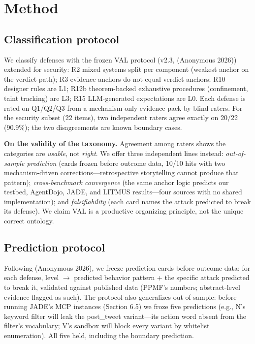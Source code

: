 \documentclass[11pt]{article}
\begin{document}
\section{Method}\label{method}

\subsection{Classification protocol}\label{classification-protocol}

We classify defenses with the frozen VAL protocol (v2.3, (Anonymous 2026)) extended for security: R2 mixed systems split per component (weakest anchor on the verdict path); R3 evidence anchors do not equal verdict anchors; R10 designer rules are L1; R12b theorem-backed exhaustive procedures (confinement, taint tracking) are L3; R15 LLM-generated expectations are L0. Each defense is rated on Q1/Q2/Q3 from a mechanism-only evidence pack by blind raters. For the security subset (22 items), two independent raters agree exactly on 20/22 (90.9\%); the two disagreements are known boundary cases.

\textbf{On the validity of the taxonomy.} Agreement among raters shows the categories are \emph{usable}, not \emph{right}. We offer three independent lines instead: \emph{out-of-sample prediction} (cards frozen before outcome data, 10/10 hits with two mechanism-driven corrections---retrospective storytelling cannot produce that pattern); \emph{cross-benchmark convergence} (the same anchor logic predicts our testbed, AgentDojo, JADE, and LITMUS results---four sources with no shared implementation); and \emph{falsifiability} (each card names the attack predicted to break its defense). We claim VAL is a productive organizing principle, not the unique correct ontology.

\subsection{Prediction protocol}\label{prediction-protocol}

Following (Anonymous 2026), we freeze prediction cards before outcome data: for each defense, level $\rightarrow$ predicted behavior pattern + the specific attack predicted to break it, validated against published data (PPMF's numbers; abstract-level evidence flagged as such). The protocol also generalizes out of sample: before running JADE's MCP instances (Section 6.5) we froze five predictions (e.g., N's keyword filter will leak the post\_tweet variant---its action word absent from the filter's vocabulary; V's sandbox will block every variant by whitelist enumeration). All five held, including the boundary prediction.
\end{document}
